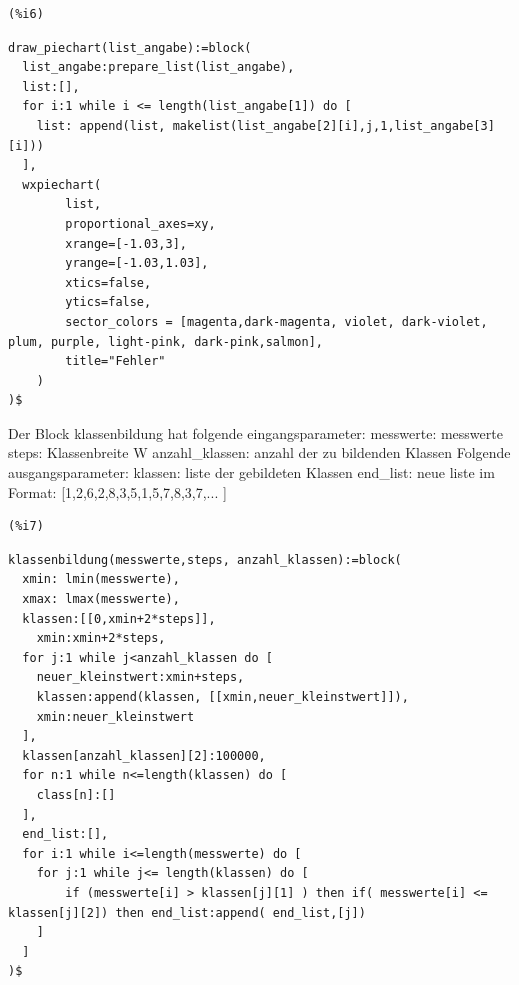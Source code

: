 \documentclass{article}
\begin{document}
\noindent
\begin{minipage}[t]{8ex}{\color{red}\bf
\begin{verbatim}
(%i6) 
\end{verbatim}}
\end{minipage}
\begin{minipage}[t]{\textwidth}{\color{blue}
\begin{verbatim}
draw_piechart(list_angabe):=block(
  list_angabe:prepare_list(list_angabe),
  list:[],
  for i:1 while i <= length(list_angabe[1]) do [
    list: append(list, makelist(list_angabe[2][i],j,1,list_angabe[3][i]))
  ],
  wxpiechart(
        list,
        proportional_axes=xy,
        xrange=[-1.03,3], 
        yrange=[-1.03,1.03],
        xtics=false,
        ytics=false,
        sector_colors = [magenta,dark-magenta, violet, dark-violet, plum, purple, light-pink, dark-pink,salmon],
        title="Fehler"
    )
)$
\end{verbatim}}
\end{minipage}

Der Block klassenbildung hat folgende eingangsparameter:
    messwerte: messwerte
    steps: Klassenbreite W
    anzahl\_klassen: anzahl der zu bildenden Klassen
Folgende ausgangsparameter:
    klassen: liste der gebildeten Klassen
    end\_list: neue liste im Format: [1,2,6,2,8,3,5,1,5,7,8,3,7,... ]

\noindent
\begin{minipage}[t]{8ex}{\color{red}\bf
\begin{verbatim}
(%i7) 
\end{verbatim}}
\end{minipage}
\begin{minipage}[t]{\textwidth}{\color{blue}
\begin{verbatim}
klassenbildung(messwerte,steps, anzahl_klassen):=block(
  xmin: lmin(messwerte),
  xmax: lmax(messwerte),
  klassen:[[0,xmin+2*steps]],
    xmin:xmin+2*steps,
  for j:1 while j<anzahl_klassen do [
    neuer_kleinstwert:xmin+steps,
    klassen:append(klassen, [[xmin,neuer_kleinstwert]]),
    xmin:neuer_kleinstwert
  ],
  klassen[anzahl_klassen][2]:100000,  
  for n:1 while n<=length(klassen) do [
    class[n]:[]
  ],
  end_list:[],
  for i:1 while i<=length(messwerte) do [ 
    for j:1 while j<= length(klassen) do [
        if (messwerte[i] > klassen[j][1] ) then if( messwerte[i] <= klassen[j][2]) then end_list:append( end_list,[j])
    ]
  ]
)$
\end{verbatim}}
\end{minipage}
\end{document}
